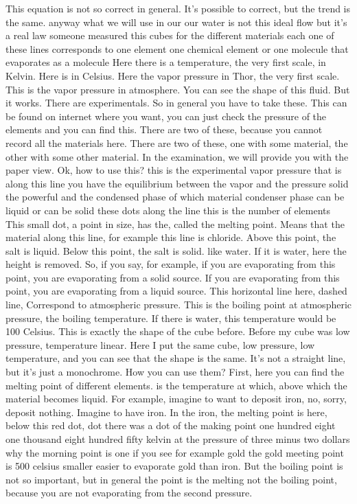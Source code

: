 This equation is not so correct in general. It's possible to correct, but the trend is the same. anyway what we will use in our our water is not this ideal flow but it's a real law someone measured this cubes for the different materials each one of these lines corresponds to one element one chemical element or one molecule that evaporates as a molecule Here there is a temperature, the very first scale, in Kelvin. Here is in Celsius. Here the vapor pressure in Thor, the very first scale. This is the vapor pressure in atmosphere. You can see the shape of this fluid. But it works. There are experimentals. So in general you have to take these. This can be found on internet where you want, you can just check the pressure of the elements and you can find this. There are two of these, because you cannot record all the materials here. There are two of these, one with some material, the other with some other material. In the examination, we will provide you with the paper view. Ok, how to use this? this is the experimental vapor pressure that is along this line you have the equilibrium between the vapor and the pressure solid the powerful and the condensed phase of which material condenser phase can be liquid or can be solid these dots along the line this is the number of elements This small dot, a point in size, has the, called the melting point. Means that the material along this line, for example this line is chloride. Above this point, the salt is liquid. Below this point, the salt is solid. like water. If it is water, here the height is removed. So, if you say, for example, if you are evaporating from this point, you are evaporating from a solid source. If you are evaporating from this point, you are evaporating from a liquid source. This horizontal line here, dashed line, Correspond to atmospheric pressure. This is the boiling point at atmospheric pressure, the boiling temperature. If there is water, this temperature would be 100 Celsius. This is exactly the shape of the cube before. Before my cube was low pressure, temperature linear. Here I put the same cube, low pressure, low temperature, and you can see that the shape is the same. It's not a straight line, but it's just a monochrome.
How you can use them? First, here you can find the melting point of different elements. is the temperature at which, above which the material becomes liquid. For example, imagine to want to deposit iron, no, sorry, deposit nothing. Imagine to have iron. In the iron, the melting point is here, below this red dot, dot there was a dot of the making point one hundred eight one thousand eight hundred fifty kelvin at the pressure of three minus two dollars why the morning point is one if you see for example gold the gold meeting point is 500 celsius smaller easier to evaporate gold than iron. But the boiling point is not so important, but in general the point is the melting not the boiling point, because you are not evaporating from the second pressure.
